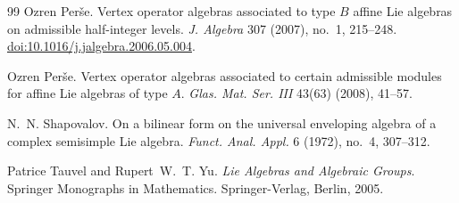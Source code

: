 \documentclass[11pt,a4paper]{amsart}
\theoremstyle{plain}
\numberwithin{equation}{section}
\begin{document}
\begin{thebibliography}{99}
Ozren Per\v{s}e.
\newblock Vertex operator algebras associated to type \(B\) affine
Lie algebras on admissible half-integer levels.
\newblock \emph{J. Algebra} 307 (2007), no.~1, 215--248.
\newblock \href{https://doi.org/10.1016/j.jalgebra.2006.05.004}
{doi:10.1016/j.jalgebra.2006.05.004}.

Ozren Per{\v{s}}e.
\newblock Vertex operator algebras associated to certain admissible modules
for affine Lie algebras of type $A$.
\newblock \emph{Glas. Mat. Ser. III} 43(63) (2008), 41--57.

N.~N. Shapovalov.
\newblock On a bilinear form on the universal enveloping algebra of a complex
semisimple Lie algebra.
\newblock \emph{Funct. Anal. Appl.} 6 (1972), no.~4, 307--312.

Patrice Tauvel and Rupert~W.~T. Yu.
\newblock \emph{Lie Algebras and Algebraic Groups}.
\newblock Springer Monographs in Mathematics.
Springer-Verlag, Berlin, 2005.
\end{thebibliography}
\end{document}
